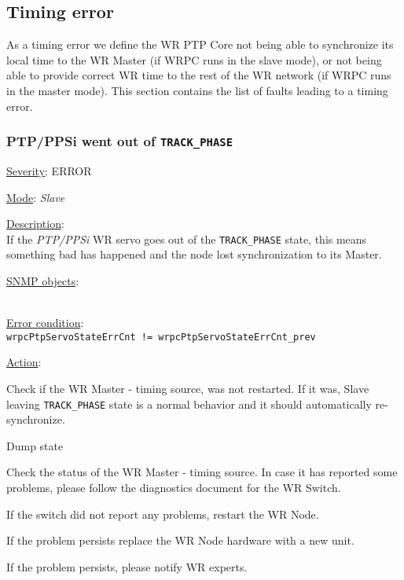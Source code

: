 \newpage
\subsection{Timing error}
\label{sec:timing_fail}
As a timing error we define the WR PTP Core not being able to synchronize its
local time to the WR Master (if WRPC runs in the slave mode), or not being able
to provide correct WR time to the rest of the WR network (if WRPC runs in the
master mode). This section contains the list of faults leading to a timing error.

\subsubsection{\bf PTP/PPSi went out of \texttt{TRACK\_PHASE}}
		\label{fail:timing:ppsi_track_phase}
		\begin{pck_descr}
			\item [] \underline{Severity}: ERROR
			\item [] \underline{Mode}: \emph{Slave}
			\item [] \underline{Description}:\\
				If the \emph{PTP/PPSi} WR servo goes out of the \texttt{TRACK\_PHASE}
				state, this means something bad has happened and the node lost
        synchronization to its Master.
			\item [] \underline{SNMP objects}:\\
				{\footnotesize
				\\
				 }
			\item [] \underline{Error condition}:\\
				{\footnotesize
				\texttt{wrpcPtpServoStateErrCnt != wrpcPtpServoStateErrCnt\_prev} }
      \item [] \underline{Action}:
        \begin{pck_proc}
        \item Check if the WR Master - timing source, was not restarted. If it
          was, Slave leaving \texttt{TRACK\_PHASE} state is a normal behavior
          and it should automatically re-synchronize.
        \item Dump state
        \item Check the status of the WR Master - timing source. In case it has
          reported some problems, please follow the diagnostics document for the
          WR Switch.
        \item If the switch did not report any problems, restart the WR Node.
        \item If the problem persists replace the WR Node hardware with a new
          unit.
        \item If the problem persists, please notify WR experts.
        \end{pck_proc}
		\end{pck_descr}

